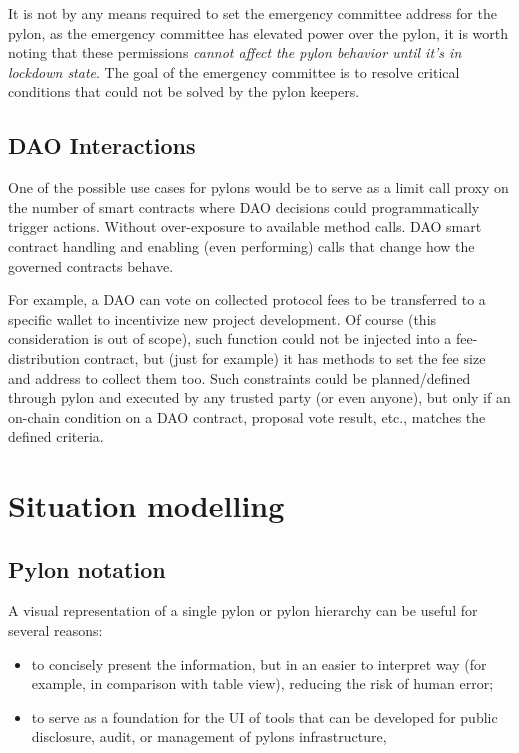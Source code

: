\documentclass[12pt]{article}
\begin{document}
It is not by any means required to set the emergency committee address for the pylon, as the emergency committee has elevated power over the pylon, it is worth noting that these permissions \emph{cannot affect the pylon behavior until it's in lockdown state}. The goal of the emergency committee is to resolve critical conditions that could not be solved by the pylon keepers.

\subsection{DAO Interactions}

One of the possible use cases for pylons would be to serve as a limit call proxy on the number of smart contracts where DAO decisions could programmatically trigger actions. Without over-exposure to available method calls. DAO smart contract handling and enabling (even performing) calls that change how the governed contracts behave.

For example, a DAO can vote on collected protocol fees to be transferred to a specific wallet to incentivize new project development. Of course (this consideration is out of scope), such function could not be injected into a fee-distribution contract, but (just for example) it has methods to set the fee size and address to collect them too. Such constraints could be planned/defined through pylon and executed by any trusted party (or even anyone), but only if an on-chain condition on a DAO contract, proposal vote result, etc., matches the defined criteria.

\pagebreak
\section{Situation modelling}
\label{situation_modelling}

\subsection{Pylon notation}

A visual representation of a single pylon or pylon hierarchy can be useful for several reasons:
\begin{itemize}
\item{to concisely present the information, but in an easier to interpret way (for example, in comparison with table view), reducing the risk of human error;}
\item{to serve as a foundation for the UI of tools that can be developed for public disclosure, audit, or management of pylons infrastructure,}
\end{itemize}
\end{document}
